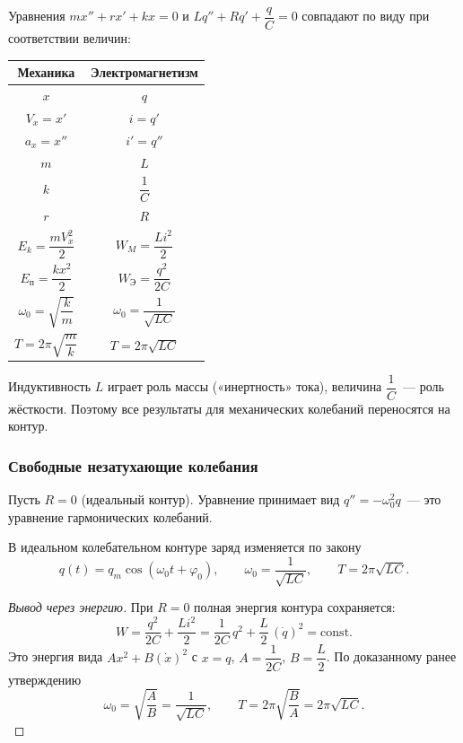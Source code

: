 \documentclass[12pt]{article}
\begin{document}
	\begin{property}
		Уравнения $mx'' + rx' + kx = 0$ и $Lq'' + Rq' + \dfrac{q}{C} = 0$ совпадают по виду при соответствии величин:
		\begin{center}
			\renewcommand{\arraystretch}{1.6}
			\begin{tabular}{c|c}
				\textbf{Механика} & \textbf{Электромагнетизм} \\ \hline
				$x$ & $q$ \\
				$V_x = x'$ & $i = q'$ \\
				$a_x = x''$ & $i' = q''$ \\
				$m$ & $L$ \\
				$k$ & $\dfrac{1}{C}$ \\
				$r$ & $R$ \\
				$E_k = \dfrac{mV_x^2}{2}$ & $W_M = \dfrac{Li^2}{2}$ \\
				$E_{\text{п}} = \dfrac{kx^2}{2}$ & $W_{\text{Э}} = \dfrac{q^2}{2C}$ \\
				$\omega_0 = \sqrt{\dfrac{k}{m}}$ & $\omega_0 = \dfrac{1}{\sqrt{LC}}$ \\
				$T = 2\pi\sqrt{\dfrac{m}{k}}$ & $T = 2\pi\sqrt{LC}$
			\end{tabular}
		\end{center}
		Индуктивность $L$ играет роль массы («инертность» тока), величина $\dfrac{1}{C}$~--- роль жёсткости. Поэтому все результаты для механических колебаний переносятся на контур.
	\end{property}
	
	\subsubsection{Свободные незатухающие колебания}
	
	Пусть $R = 0$ (идеальный контур). Уравнение принимает вид $q'' = -\omega_0^2 q$~--- это уравнение гармонических колебаний.
	
	\begin{statement}
		В идеальном колебательном контуре заряд изменяется по закону
		\[
			q(t) = q_m \cos (\omega_0 t + \varphi_0), \qquad \omega_0 = \dfrac{1}{\sqrt{LC}}, \qquad T = 2\pi \sqrt{LC}.
		\]
	\end{statement}
	\begin{proof}[Вывод через энергию]
		При $R = 0$ полная энергия контура сохраняется:
		\[
			W = \dfrac{q^2}{2C} + \dfrac{Li^2}{2} = \dfrac{1}{2C}\,q^2 + \dfrac{L}{2}\,(\dot q)^2 = \mathrm{const}.
		\]
		Это энергия вида $Ax^2 + B(\dot x)^2$ с $x = q$, $A = \dfrac{1}{2C}$, $B = \dfrac{L}{2}$. По доказанному ранее утверждению
		\[
			\omega_0 = \sqrt{\dfrac{A}{B}} = \dfrac{1}{\sqrt{LC}}, \qquad T = 2\pi \sqrt{\dfrac{B}{A}} = 2\pi \sqrt{LC}.
		\]
	\end{proof}
	
\end{document}
